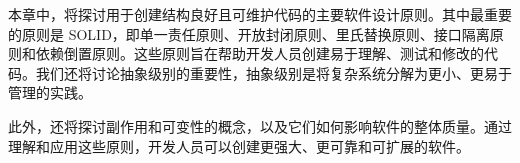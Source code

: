 本章中，将探讨用于创建结构良好且可维护代码的主要软件设计原则。其中最重要的原则是 SOLID，即单一责任原则、开放封闭原则、里氏替换原则、接口隔离原则和依赖倒置原则。这些原则旨在帮助开发人员创建易于理解、测试和修改的代码。我们还将讨论抽象级别的重要性，抽象级别是将复杂系统分解为更小、更易于管理的实践。

此外，还将探讨副作用和可变性的概念，以及它们如何影响软件的整体质量。通过理解和应用这些原则，开发人员可以创建更强大、更可靠和可扩展的软件。
